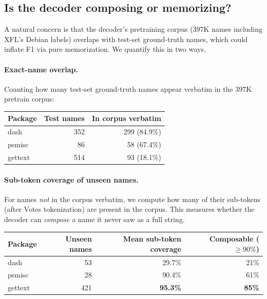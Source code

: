 \subsection{Is the decoder composing or memorizing?}
\label{sec:comp-vs-mem}

A natural concern is that the decoder's pretraining corpus (397K names including XFL's Debian labels) overlaps with test-set ground-truth names, which could inflate F1 via pure memorization. We quantify this in two ways.

\paragraph{Exact-name overlap.}
Counting how many test-set ground-truth names appear verbatim in the 397K pretrain corpus:

\begin{table}[h]
\centering\small
\begin{tabular}{lrr}
\toprule
Package & Test names & In corpus verbatim \\
\midrule
dash    &   352 & 299 (84.9\%) \\
psmisc  &    86 &  58 (67.4\%) \\
gettext &   514 &  93 (18.1\%) \\
\bottomrule
\end{tabular}
\end{table}

\paragraph{Sub-token coverage of unseen names.}
For names \emph{not} in the corpus verbatim, we compute how many of their sub-tokens (after Votes tokenization) are present in the corpus. This measures whether the decoder can \emph{compose} a name it never saw as a full string.

\begin{table}[h]
\centering\small
\begin{tabular}{lrrr}
\toprule
Package & Unseen names & Mean sub-token coverage & Composable ($\geq\!90\%$) \\
\midrule
dash    &  53 & 29.7\% & 21\% \\
psmisc  &  28 & 90.4\% & 61\% \\
gettext & 421 & \textbf{95.3\%} & \textbf{85\%} \\
\bottomrule
\end{tabular}
\end{table}

